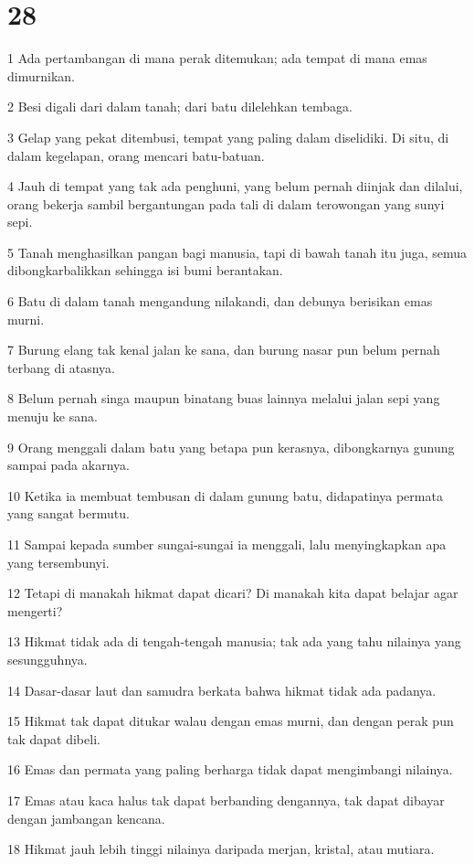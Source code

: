 \chapter{28}

\par 1 Ada pertambangan di mana perak ditemukan; ada tempat di mana emas dimurnikan.
\par 2 Besi digali dari dalam tanah; dari batu dilelehkan tembaga.
\par 3 Gelap yang pekat ditembusi, tempat yang paling dalam diselidiki. Di situ, di dalam kegelapan, orang mencari batu-batuan.
\par 4 Jauh di tempat yang tak ada penghuni, yang belum pernah diinjak dan dilalui, orang bekerja sambil bergantungan pada tali di dalam terowongan yang sunyi sepi.
\par 5 Tanah menghasilkan pangan bagi manusia, tapi di bawah tanah itu juga, semua dibongkarbalikkan sehingga isi bumi berantakan.
\par 6 Batu di dalam tanah mengandung nilakandi, dan debunya berisikan emas murni.
\par 7 Burung elang tak kenal jalan ke sana, dan burung nasar pun belum pernah terbang di atasnya.
\par 8 Belum pernah singa maupun binatang buas lainnya melalui jalan sepi yang menuju ke sana.
\par 9 Orang menggali dalam batu yang betapa pun kerasnya, dibongkarnya gunung sampai pada akarnya.
\par 10 Ketika ia membuat tembusan di dalam gunung batu, didapatinya permata yang sangat bermutu.
\par 11 Sampai kepada sumber sungai-sungai ia menggali, lalu menyingkapkan apa yang tersembunyi.
\par 12 Tetapi di manakah hikmat dapat dicari? Di manakah kita dapat belajar agar mengerti?
\par 13 Hikmat tidak ada di tengah-tengah manusia; tak ada yang tahu nilainya yang sesungguhnya.
\par 14 Dasar-dasar laut dan samudra berkata bahwa hikmat tidak ada padanya.
\par 15 Hikmat tak dapat ditukar walau dengan emas murni, dan dengan perak pun tak dapat dibeli.
\par 16 Emas dan permata yang paling berharga tidak dapat mengimbangi nilainya.
\par 17 Emas atau kaca halus tak dapat berbanding dengannya, tak dapat dibayar dengan jambangan kencana.
\par 18 Hikmat jauh lebih tinggi nilainya daripada merjan, kristal, atau mutiara.
